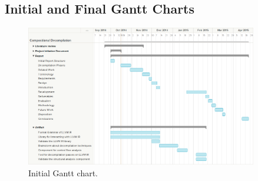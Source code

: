 
\subsection{Initial and Final Gantt Charts}

\begin{figure}[htbp]
	\begin{center}
		\includegraphics[angle=270, width=0.9\textwidth]{appendices/gantt_charts/gantt_initial.png}
		\caption{Initial Gantt chart.}
	\end{center}
\end{figure}

